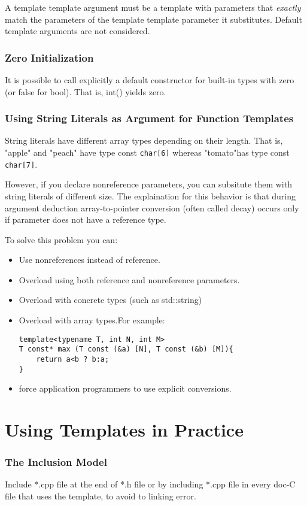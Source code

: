\documentclass[11pt, a4paper]{book}
\begin{document}
\begin{itemize}
A template template argument must be a template with parameters that \emph{exactly} match the parameters of the template template parameter it substitutes. Default template arguments are not considered.
\subsubsection{Zero Initialization}
It is possible to call explicitly a default constructor for built-in types with zero (or false for bool). That is, int() yields zero.
\subsubsection{Using String Literals as Argument for Function Templates}
String literals have different array types depending on their length. That is, "apple" and "peach" have type const \verb|char[6]| whereas "tomato"has type const \verb|char[7]|. 

However, if you declare nonreference parameters, you can subsitute them with string literals of different size. The explaination for this behavior is that during argument deduction array-to-pointer conversion (often called decay) occurs only if parameter does not have a reference type.

To solve this problem you can:
\begin{itemize}
\item Use nonreferences instead of reference.
\item Overload using both reference and nonreference parameters.
\item Overload with concrete types (such as std::string)
\item Overload with array types.For example:
\begin{verbatim}
template<typename T, int N, int M>
T const* max (T const (&a) [N], T const (&b) [M]){
    return a<b ? b:a;
}
\end{verbatim}
\item force application programmers to use explicit conversions.
\end{itemize}
\section{Using Templates in Practice}
\subsubsection{The Inclusion Model}
Include *.cpp file at the end of *.h file or by including *.cpp file in every doc-C file that uses the template, to avoid to linking error.


\end{itemize}
\end{document}
